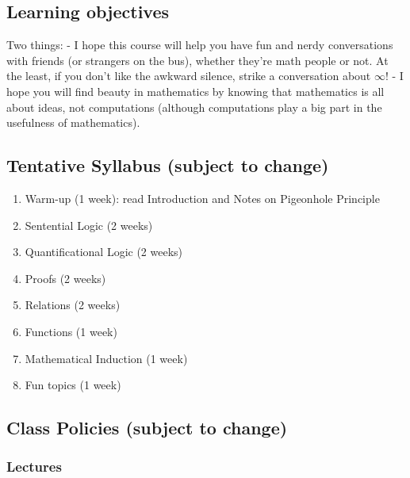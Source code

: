 \documentclass[
]{article}
\begin{document}
\hypertarget{learning-objectives}{%
\subsection*{Learning objectives}\label{learning-objectives}}

Two things:
- I hope this course will help you have fun and nerdy conversations with friends (or strangers on the bus), whether they're math people or not.
At the least, if you don't like the awkward silence, strike a conversation about \(\infty\)!
- I hope you will find beauty in mathematics by knowing that mathematics is all about ideas,
not computations (although computations play a big part in the usefulness of mathematics).

\hypertarget{tentative-syllabus-subject-to-change}{%
\subsection*{Tentative Syllabus (subject to change)}\label{tentative-syllabus-subject-to-change}}

\begin{enumerate}
\def\labelenumi{\arabic{enumi}.}
\item
  Warm-up (1 week): read Introduction and Notes on Pigeonhole Principle
\item
  Sentential Logic (2 weeks)
\item
  Quantificational Logic (2 weeks)
\item
  Proofs (2 weeks)
\item
  Relations (2 weeks)
\item
  Functions (1 week)
\item
  Mathematical Induction (1 week)
\item
  Fun topics (1 week)
\end{enumerate}

\hypertarget{class-policies-subject-to-change}{%
\subsection*{Class Policies (subject to change)}\label{class-policies-subject-to-change}}

\hypertarget{lectures}{%
\subsubsection*{Lectures}\label{lectures}}
\end{document}
